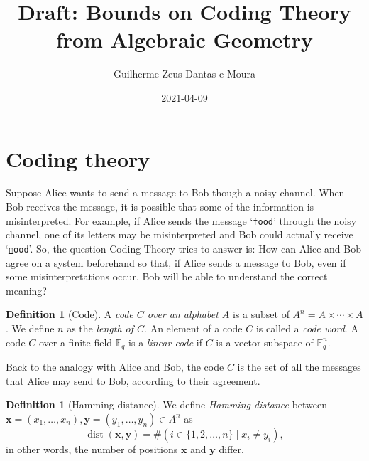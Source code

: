 \documentclass[11pt, oneside]{amsart}
\title[Draft: Codes from Algebraic Geometry]{Draft: Bounds on Coding Theory\\from Algebraic Geometry}
\author{Guilherme Zeus Dantas e Moura}
\date{2021-04-09} %
\theoremstyle{definition}
\newtheorem{defn}[thm]{Definition}
\theoremstyle{remark}
\numberwithin{equation}{section}
\DeclareMathOperator{\dist}{dist}
\begin{document}
%    

\maketitle

\section{Coding theory} \label{s:codingtheory}

Suppose Alice wants to send a message to Bob though a noisy channel.
When Bob receives the message, it is possible that some of the information is misinterpreted.
For example, if Alice sends the message `\texttt{food}' through the noisy channel, one of its letters may be misinterpreted and Bob could actually receive `\texttt{\underline{m}ood}'.
So, the question Coding Theory tries to answer is:
How can Alice and Bob agree on a system beforehand so that, if Alice sends a message to Bob, even if some misinterpretations occur, Bob will be able to understand the correct meaning?

\begin{defn}[Code] \label{defn:code}
    A \emph{code $C$ over an alphabet $A$} is a subset of $A^n = A \times \cdots \times A$.
    We define $n$ as the \emph{length of $C$}.
	An element of a code $C$ is called a \emph{code word}.
	A code $C$ over a finite field $\mathbb{F}_q$ is a \emph{linear code} if $C$ is a vector subspace of $\mathbb{F}_q^n$.
\end{defn}

Back to the analogy with Alice and Bob, the code $C$ is the set of all the messages that Alice may send to Bob, according to their agreement.

\begin{defn}[Hamming distance] \label{defn:hamming}
    We define \emph{Hamming distance} between $\mathbf{x} = (x_1, \dots, x_n), \mathbf{y} = (y_1, \dots, y_n) \in A^n$ as
    \begin{equation}
		\dist(\mathbf{x}, \mathbf{y}) = \#\left(i \in \{1, 2, \dots, n\} \mid x_i \neq y_i\right),
	\end{equation}
    in other words, the number of positions $\mathbf{x}$ and $\mathbf{y}$ differ.
\end{defn}
\end{document}
